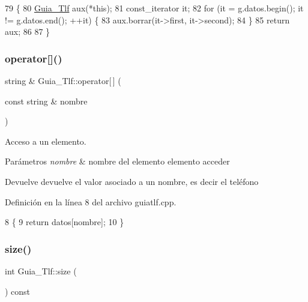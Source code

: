\begin{DoxyCode}
79                                                \{
80     \hyperlink{classGuia__Tlf}{Guia\_Tlf} aux(*\textcolor{keyword}{this});
81     const\_iterator it;
82     \textcolor{keywordflow}{for} (it = g.datos.begin(); it != g.datos.end(); ++it) \{
83         aux.borrar(it->first, it->second);
84     \}
85     \textcolor{keywordflow}{return} aux;
86 
87 \}
\end{DoxyCode}
\mbox{\label{classGuia__Tlf_ab2c734a7f3f3cd63ad95f525502474ea}} 
\subsubsection{\texorpdfstring{operator[]()}{operator[]()}}
{\footnotesize\ttfamily string \& Guia\+\_\+\+Tlf\+::operator\mbox{[}$\,$\mbox{]} (\begin{DoxyParamCaption}\item[{const string \&}]{nombre }\end{DoxyParamCaption})}



Acceso a un elemento. 


\begin{DoxyParams}{Parámetros}
{\em nombre} & nombre del elemento elemento acceder \\
\hline
\end{DoxyParams}
\begin{DoxyReturn}{Devuelve}
devuelve el valor asociado a un nombre, es decir el teléfono 
\end{DoxyReturn}


Definición en la línea 8 del archivo guiatlf.\+cpp.


\begin{DoxyCode}
8                                                   \{
9     \textcolor{keywordflow}{return} datos[nombre];
10 \}
\end{DoxyCode}
\mbox{\label{classGuia__Tlf_a727ab46d490b4196a71f623644906a81}} 
\subsubsection{\texorpdfstring{size()}{size()}}
{\footnotesize\ttfamily int Guia\+\_\+\+Tlf\+::size (\begin{DoxyParamCaption}{ }\end{DoxyParamCaption}) const}



